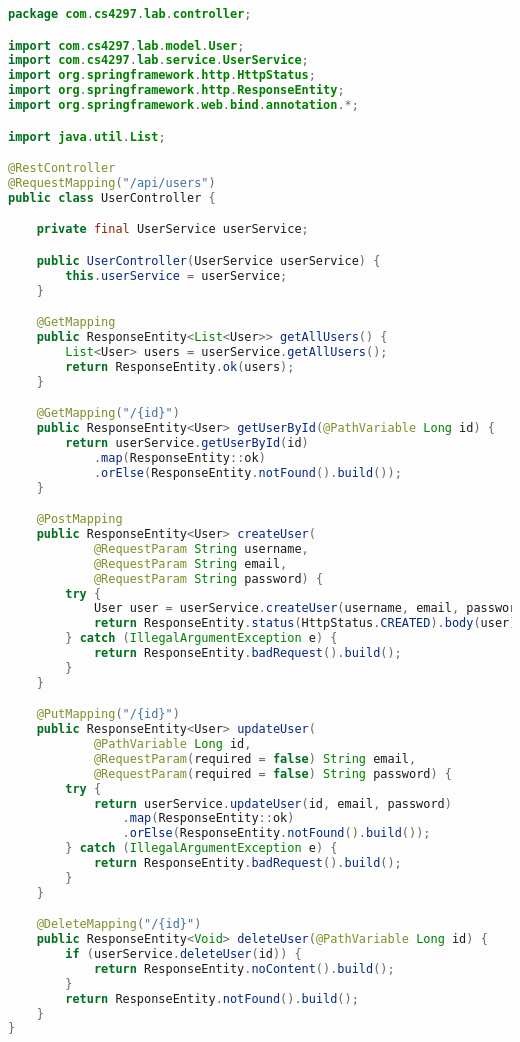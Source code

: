 \documentclass[12pt,a4paper]{article}
\begin{document}
\begin{lstlisting}[language=java, caption=UserController.java - REST API Endpoints]
package com.cs4297.lab.controller;

import com.cs4297.lab.model.User;
import com.cs4297.lab.service.UserService;
import org.springframework.http.HttpStatus;
import org.springframework.http.ResponseEntity;
import org.springframework.web.bind.annotation.*;

import java.util.List;

@RestController
@RequestMapping("/api/users")
public class UserController {

    private final UserService userService;

    public UserController(UserService userService) {
        this.userService = userService;
    }

    @GetMapping
    public ResponseEntity<List<User>> getAllUsers() {
        List<User> users = userService.getAllUsers();
        return ResponseEntity.ok(users);
    }

    @GetMapping("/{id}")
    public ResponseEntity<User> getUserById(@PathVariable Long id) {
        return userService.getUserById(id)
            .map(ResponseEntity::ok)
            .orElse(ResponseEntity.notFound().build());
    }

    @PostMapping
    public ResponseEntity<User> createUser(
            @RequestParam String username,
            @RequestParam String email,
            @RequestParam String password) {
        try {
            User user = userService.createUser(username, email, password);
            return ResponseEntity.status(HttpStatus.CREATED).body(user);
        } catch (IllegalArgumentException e) {
            return ResponseEntity.badRequest().build();
        }
    }

    @PutMapping("/{id}")
    public ResponseEntity<User> updateUser(
            @PathVariable Long id,
            @RequestParam(required = false) String email,
            @RequestParam(required = false) String password) {
        try {
            return userService.updateUser(id, email, password)
                .map(ResponseEntity::ok)
                .orElse(ResponseEntity.notFound().build());
        } catch (IllegalArgumentException e) {
            return ResponseEntity.badRequest().build();
        }
    }

    @DeleteMapping("/{id}")
    public ResponseEntity<Void> deleteUser(@PathVariable Long id) {
        if (userService.deleteUser(id)) {
            return ResponseEntity.noContent().build();
        }
        return ResponseEntity.notFound().build();
    }
}
\end{lstlisting}
\end{document}
